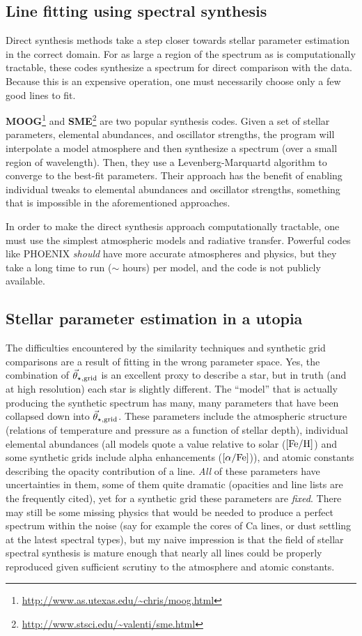 \documentclass[preprint]{aastex} %
\newcommand{\vt}{\vec{\theta}}
\newcommand{\vg}{\vt_{\star, {\rm grid}}}
\newcommand{\Z}{[{\rm Fe}/{\rm H}]}
\newcommand{\A}{[\alpha/{\rm Fe}]}
\begin{document}
\subsection{Line fitting using spectral synthesis}
Direct synthesis methods take a step closer towards stellar parameter estimation in the correct domain. For as large a region of the spectrum as is computationally tractable, these codes synthesize a spectrum for direct comparison with the data. Because this is an expensive operation, one must necessarily choose only a few good lines to fit. 

\textbf{MOOG}\footnote{\url{http://www.as.utexas.edu/~chris/moog.html}} \citep{sne73} and \textbf{SME}\footnote{\url{http://www.stsci.edu/~valenti/sme.html}} \citep{vp96} are two popular synthesis codes. Given a set of stellar parameters, elemental abundances, and oscillator strengths, the program will interpolate a model atmosphere and then synthesize a spectrum (over a small region of wavelength). Then, they use a Levenberg-Marquartd algorithm to converge to the best-fit parameters. Their approach has the benefit of enabling individual tweaks to elemental abundances and oscillator strengths, something that is impossible in the aforementioned approaches.

In order to make the direct synthesis approach computationally tractable, one must use the simplest atmospheric models and radiative transfer. Powerful codes like PHOENIX \citep{hwd+13} \emph{should} have more accurate atmospheres and physics, but they take a long time to run ($\sim$ hours) per model, and the code is not publicly available. 

\subsection{Stellar parameter estimation in a utopia}
The difficulties encountered by the similarity techniques and synthetic grid comparisons are a result of fitting in the wrong parameter space. Yes, the combination of $\vg$ is an excellent proxy to describe a star, but in truth (and at high resolution) each star is slightly different. The ``model'' that is actually producing the synthetic spectrum has many, many parameters that have been collapsed down into $\vg$. These parameters include the atmospheric structure (relations of temperature and pressure as a function of stellar depth), individual elemental abundances (all models quote a value relative to solar ($\Z$) and some synthetic grids include alpha enhancements ($\A$)), and atomic constants describing the opacity contribution of a line. \emph{All} of these parameters have uncertainties in them, some of them quite dramatic (opacities and line lists are the frequently cited), yet for a synthetic grid these parameters are \emph{fixed}. There may still be some missing physics that would be needed to produce a perfect spectrum within the noise (say for example the cores of Ca lines, or dust settling at the latest spectral types), but my naive impression is that the field of stellar spectral synthesis is mature enough that nearly all lines could be properly reproduced given sufficient scrutiny to the atmosphere and atomic constants. 
\end{document}
